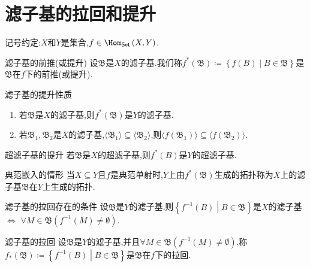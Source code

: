 \section{滤子基的拉回和提升}

记号约定:$X$和$Y$是集合,$f\in\Hom_{\mathsf{Set}}\left(X,Y\right)$.

\begin{definition}{滤子基的前推(或提升)}{}
	设$\mathfrak{B}$是$X$的滤子基.我们称$f^{\ast}\left(\mathfrak{B}\right)\coloneq\left\{f\left(B\right)\middle|B\in\mathfrak{B}\right\}$是$\mathfrak{B}$在$f$下的前推(或提升).
\end{definition}

\begin{proposition}{滤子基的提升性质}{}
	\begin{enumerate}
		\item 若$\mathfrak{B}$是$X$的滤子基,则$f^{\ast}\left(\mathfrak{B}\right)$是$Y$的滤子基.
		\item 若$\mathfrak{B}_{1},\mathfrak{B}_{2}$是$X$的滤子基,$\langle\mathfrak{B}_{1}\rangle\subseteq\langle\mathfrak{B}_{2}\rangle$,则$\langle f\left(\mathfrak{B}_{1}\right)\rangle\subseteq\langle f\left(\mathfrak{B}_{2}\right)\rangle$.
	\end{enumerate}
\end{proposition}

\begin{proposition}{超滤子基的提升}{}
	若$\mathfrak{B}$是$X$的超滤子基,则$f^{\ast}\left(B\right)$是$Y$的超滤子基.
\end{proposition}

\begin{remark}{典范嵌入的情形}{}
	当$X\subseteq Y$且$f$是典范单射时,$Y$上由$f^{\ast}\left(\mathfrak{B}\right)$生成的拓扑称为$X$上的滤子基$\mathfrak{B}$在$Y$上生成的拓扑.
\end{remark}

\begin{proposition}{滤子基的拉回存在的条件}{}
	设$\mathfrak{B}$是$Y$的滤子基,则$\left\{f^{-1}\left(B\right)\middle|B\in\mathfrak{B}\right\}$是$X$的滤子基$\iff$ $\forall M\in\mathfrak{B}\left(f^{-1}\left(M\right)\neq\emptyset\right)$.
\end{proposition}

\begin{definition}{滤子基的拉回}{}
	设$\mathfrak{B}$是$Y$的滤子基,并且$\forall M\in\mathfrak{B}\left(f^{-1}\left(M\right)\neq\emptyset\right)$.称$f_{\ast}\left(\mathfrak{B}\right)\coloneq\left\{f^{-1}\left(B\right)\middle|B\in\mathfrak{B}\right\}$是$\mathfrak{B}$在$f$下的拉回.
\end{definition}

